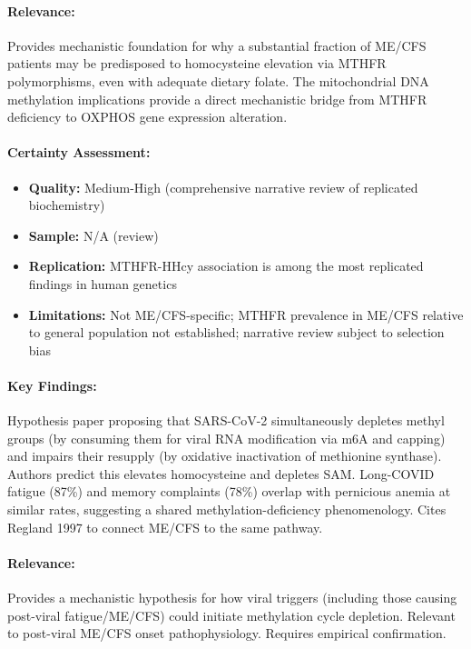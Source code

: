 \paragraph{Relevance:}
Provides mechanistic foundation for why a substantial fraction of ME/CFS patients may be
predisposed to homocysteine elevation via MTHFR polymorphisms, even with adequate dietary folate.
The mitochondrial DNA methylation implications provide a direct mechanistic bridge from MTHFR
deficiency to OXPHOS gene expression alteration.

\paragraph{Certainty Assessment:}
\begin{itemize}
  \item \textbf{Quality:} Medium-High (comprehensive narrative review of replicated biochemistry)
  \item \textbf{Sample:} N/A (review)
  \item \textbf{Replication:} MTHFR-HHcy association is among the most replicated findings in
    human genetics
  \item \textbf{Limitations:} Not ME/CFS-specific; MTHFR prevalence in ME/CFS relative to
    general population not established; narrative review subject to selection bias
\end{itemize}

\bigskip


\paragraph{Key Findings:}
Hypothesis paper proposing that SARS-CoV-2 simultaneously depletes methyl groups (by consuming
them for viral RNA modification via m6A and capping) and impairs their resupply (by oxidative
inactivation of methionine synthase). Authors predict this elevates homocysteine and depletes SAM.
Long-COVID fatigue (87\%) and memory complaints (78\%) overlap with pernicious anemia at similar
rates, suggesting a shared methylation-deficiency phenomenology. Cites Regland 1997 to connect
ME/CFS to the same pathway.

\paragraph{Relevance:}
Provides a mechanistic hypothesis for how viral triggers (including those causing post-viral
fatigue/ME/CFS) could initiate methylation cycle depletion. Relevant to post-viral ME/CFS onset
pathophysiology. Requires empirical confirmation.

